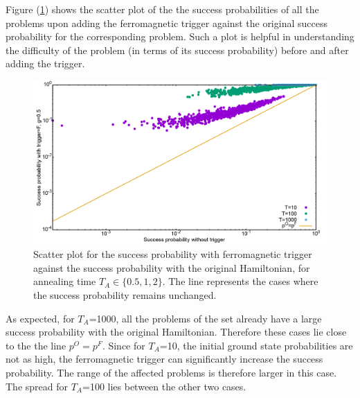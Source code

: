 \documentclass[12]{article}
\begin{document}
Figure (\ref{fig:f7}) shows the scatter plot of the the success probabilities of all the problems upon adding the ferromagnetic trigger against the original success probability for the corresponding problem. Such a plot is helpful in understanding the difficulty of the problem (in terms of its success probability) before and after adding the trigger.
\begin{figure}[H]
\centering 
\includegraphics[scale=0.3]{Scatt_s12_F_g0.png}
\caption{Scatter plot for the success probability with ferromagnetic trigger against the success probability with the original Hamiltonian, for annealing time $T_A \in \{0.5,1,2\}$. The line represents the cases where the success probability remains unchanged.}
\label{fig:f7}
\end{figure}
As expected, for $T_A$=1000, all the problems of the set already have a large success probability with the original Hamiltonian. Therefore these cases lie close to the the line $p^O=p^F$. Since for $T_A$=10, the initial ground state probabilities are not as high, the ferromagnetic trigger can significantly increase the success probability. The range of the affected problems is therefore larger in this case. The spread for $T_A$=100 lies between the other two cases.
\end{document}
